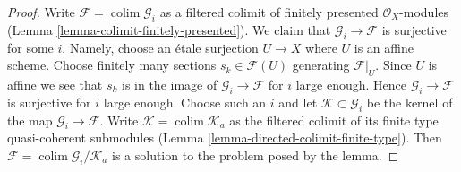 \documentclass{stacks-project}
\theoremstyle{plain}
\theoremstyle{definition}
\theoremstyle{remark}
\numberwithin{equation}{subsection}
\def\colim{\mathop{\mathrm{colim}}\nolimits}
\begin{document}
\begin{proof}
Write $\mathcal{F} = \colim \mathcal{G}_i$ as a filtered colimit of
finitely presented $\mathcal{O}_X$-modules
(Lemma \ref{lemma-colimit-finitely-presented}).
We claim that $\mathcal{G}_i \to \mathcal{F}$ is surjective for some $i$.
Namely, choose an \'etale surjection $U \to X$ where $U$ is an affine scheme.
Choose finitely many sections $s_k \in \mathcal{F}(U)$ generating
$\mathcal{F}|_U$. Since $U$ is affine we see that $s_k$ is in the image
of $\mathcal{G}_i \to \mathcal{F}$ for $i$ large enough. Hence
$\mathcal{G}_i \to \mathcal{F}$ is surjective for $i$ large enough.
Choose such an $i$ and let $\mathcal{K} \subset \mathcal{G}_i$ be the
kernel of the map $\mathcal{G}_i \to \mathcal{F}$. Write
$\mathcal{K} = \colim \mathcal{K}_a$
as the filtered colimit of its finite type quasi-coherent submodules
(Lemma \ref{lemma-directed-colimit-finite-type}). Then
$\mathcal{F} = \colim \mathcal{G}_i/\mathcal{K}_a$ is a solution
to the problem posed by the lemma.
\end{proof}
\end{document}
